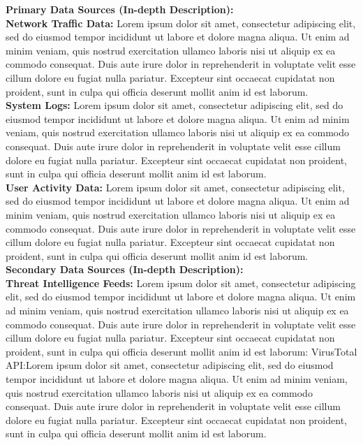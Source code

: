 \documentclass[12pt]{article}
\begin{document}
\textbf{Primary Data Sources (In-depth Description):}\\
\textbf{Network Traffic Data:} Lorem ipsum dolor sit amet, consectetur adipiscing elit, sed do eiusmod tempor incididunt ut labore et dolore magna aliqua. Ut enim ad minim veniam, quis nostrud exercitation ullamco laboris nisi ut aliquip ex ea commodo consequat. Duis aute irure dolor in reprehenderit in voluptate velit esse cillum dolore eu fugiat nulla pariatur. Excepteur sint occaecat cupidatat non proident, sunt in culpa qui officia deserunt mollit anim id est laborum.
\\
\textbf{System Logs:} Lorem ipsum dolor sit amet, consectetur adipiscing elit, sed do eiusmod tempor incididunt ut labore et dolore magna aliqua. Ut enim ad minim veniam, quis nostrud exercitation ullamco laboris nisi ut aliquip ex ea commodo consequat. Duis aute irure dolor in reprehenderit in voluptate velit esse cillum dolore eu fugiat nulla pariatur. Excepteur sint occaecat cupidatat non proident, sunt in culpa qui officia deserunt mollit anim id est laborum.\\
\textbf{User Activity Data:} Lorem ipsum dolor sit amet, consectetur adipiscing elit, sed do eiusmod tempor incididunt ut labore et dolore magna aliqua. Ut enim ad minim veniam, quis nostrud exercitation ullamco laboris nisi ut aliquip ex ea commodo consequat. Duis aute irure dolor in reprehenderit in voluptate velit esse cillum dolore eu fugiat nulla pariatur. Excepteur sint occaecat cupidatat non proident, sunt in culpa qui officia deserunt mollit anim id est laborum.\\
\textbf{Secondary Data Sources (In-depth Description):}\\
\textbf{Threat Intelligence Feeds:} Lorem ipsum dolor sit amet, consectetur adipiscing elit, sed do eiusmod tempor incididunt ut labore et dolore magna aliqua. Ut enim ad minim veniam, quis nostrud exercitation ullamco laboris nisi ut aliquip ex ea commodo consequat. Duis aute irure dolor in reprehenderit in voluptate velit esse cillum dolore eu fugiat nulla pariatur. Excepteur sint occaecat cupidatat non proident, sunt in culpa qui officia deserunt mollit anim id est laborum:
VirusTotal API:Lorem ipsum dolor sit amet, consectetur adipiscing elit, sed do eiusmod tempor incididunt ut labore et dolore magna aliqua. Ut enim ad minim veniam, quis nostrud exercitation ullamco laboris nisi ut aliquip ex ea commodo consequat. Duis aute irure dolor in reprehenderit in voluptate velit esse cillum dolore eu fugiat nulla pariatur. Excepteur sint occaecat cupidatat non proident, sunt in culpa qui officia deserunt mollit anim id est laborum.
\end{document}
